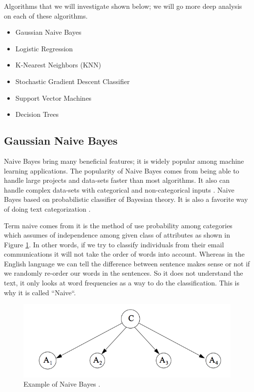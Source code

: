 \documentclass[sigconf]{acmart}
\begin{document}
\par Algorithms that we will investigate shown below; we will go more deep analysis on each of these algorithms. 

\begin{itemize}
    \item Gaussian Naive Bayes
    \item Logistic Regression
    \item K-Nearest Neighbors (KNN)
    \item Stochastic Gradient Descent Classifier
    \item Support Vector Machines
    \item Decision Trees
\end{itemize}

\subsection{Gaussian Naive Bayes}
Naive Bayes bring many beneficial features; it is widely popular among machine learning applications\cite{tapan-kumar}. The popularity of Naive Bayes comes from being able to handle large projects and data-sets faster than most algorithms\cite{tapan-kumar}. It also can handle complex data-sets with categorical and non-categorical inputs \cite{tapan-kumar}. Naive Bayes based on probabilistic classifier of Bayesian theory. It is also a favorite way of doing text categorization \cite{www-wikipedia-naivebayes}. 

\par Term naive comes from it is the method of use probability among categories which assumes of independence among given class of attributes as shown in Figure \ref{fig:Naive Bayes}. In other words, if we try to classify individuals from their email communications it will not take the order of words into account. Whereas in the English language we can tell the difference between sentence makes sense or not if we randomly re-order our words in the sentences. So it does not understand the text, it only looks at word frequencies as a way to do the classification. This is why it is called ``Naive``.  

 \begin{figure}[!ht]
    \centering
    \graphicspath{{images/}}
    \includegraphics[width=\columnwidth]{Naive-bayes}
    \caption{Example of Naive Bayes \cite{Zhang}.}\label{fig:Naive Bayes}
\end{figure}
\end{document}

